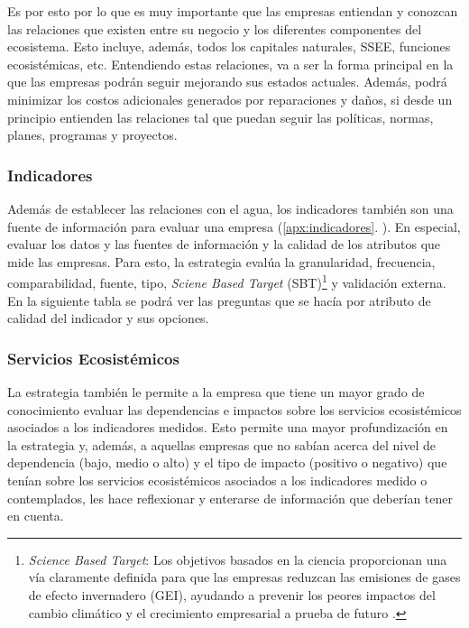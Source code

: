 \hfill
\par
\leftskip=0in \rightskip=0in
Es por esto por lo que es muy importante que las empresas entiendan y conozcan las relaciones que existen entre su negocio y los diferentes componentes del ecosistema. Esto incluye, además, todos los capitales naturales, SSEE, funciones ecosistémicas, etc. Entendiendo estas relaciones, va a ser la forma principal en la que las empresas podrán seguir mejorando sus estados actuales. Además, podrá minimizar los costos adicionales generados por reparaciones y daños, si desde un principio entienden las relaciones tal que puedan seguir las políticas, normas, planes, programas y proyectos. 

\subsubsection{Indicadores}
Además de establecer las relaciones con el agua, los indicadores también son una fuente de información para evaluar una empresa (\ref{apx:indicadores}. ). En especial, evaluar los datos y las fuentes de información y la calidad de los atributos que mide las empresas. Para esto, la estrategia evalúa la granularidad, frecuencia, comparabilidad, fuente, tipo, \textit{Sciene Based Target} (SBT)\footnote{\textit{Science Based Target}: Los objetivos basados en la ciencia proporcionan una vía claramente definida para que las empresas reduzcan las emisiones de gases de efecto invernadero (GEI), ayudando a prevenir los peores impactos del cambio climático y el crecimiento empresarial a prueba de futuro \parencite{science-based-targets-no-date}.} y validación externa. En la siguiente tabla se podrá ver las preguntas que se hacía por atributo de calidad del indicador y sus opciones.



\subsubsection{Servicios Ecosistémicos}
La estrategia también le permite a la empresa que tiene un mayor grado de conocimiento evaluar las dependencias e impactos sobre los servicios ecosistémicos asociados a los indicadores medidos. Esto permite una mayor profundización en la estrategia y, además, a aquellas empresas que no sabían acerca del nivel de dependencia (bajo, medio o alto) y el tipo de impacto (positivo o negativo) que tenían sobre los servicios ecosistémicos asociados a los indicadores medido o contemplados, les hace reflexionar y enterarse de información que deberían tener en cuenta. 



